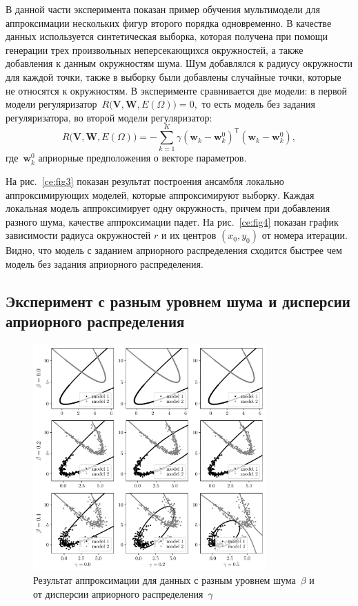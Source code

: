 \documentclass[12pt, twoside]{article}
\numberwithin{equation}{section}
\begin{document}
В данной части эксперимента показан пример обучения мультимодели для аппроксимации нескольких фигур второго порядка одновременно. В качестве данных используется синтетическая выборка, которая получена при помощи генерации трех произвольных неперсекающихся окружностей, а также добавления к данным окружностям шума. Шум добавлялся к радиусу окружности для каждой точки, также в выборку были добавлены случайные точки, которые не относятся к окружностям. В эксперименте сравнивается две модели: в первой модели регуляризатор~$R\bigl(\mathbf{V}, \mathbf{W}, E(\Omega)\bigr)=0,$ то есть модель без задания регуляризатора, во второй модели регуляризатор:
\[
R\bigl(\mathbf{V}, \mathbf{W}, E(\Omega)\bigr)= -\sum_{k=1}^{K}\gamma\left(\mathbf{w}_k - \mathbf{w}_k^{0}\right)^{\mathsf{T}}\left(\mathbf{w}_k - \mathbf{w}_k^{0}\right),
\]
где~$\mathbf{w}_k^{0}$ априорные предположения о векторе параметров.

На рис.~\ref{ce:fig3} показан результат построения ансамбля локально аппроксимирующих моделей, которые аппроксимируют выборку. Каждая локальная модель аппроксимирует одну окружность, причем при добавления разного шума, качестве аппроксимации падет.
На рис.~\ref{ce:fig4} показан график зависимости радиуса окружностей $r$ и их центров $(x_0, y_0)$ от номера итерации. Видно, что модель с заданием априорного распределения сходится быстрее чем модель без задания априорного распределения.

\subsection{Эксперимент с разным уровнем шума и дисперсии априорного распределения}
\begin{figure}[h!t]\center
\includegraphics[width=0.8\textwidth]{figures/beta_gamma}
\caption{Результат аппроксимации для данных с разным уровнем шума~$\beta$ и от дисперсии априорного распределения~$\gamma$}
\label{ce:fig6}
\end{figure}
\end{document}
